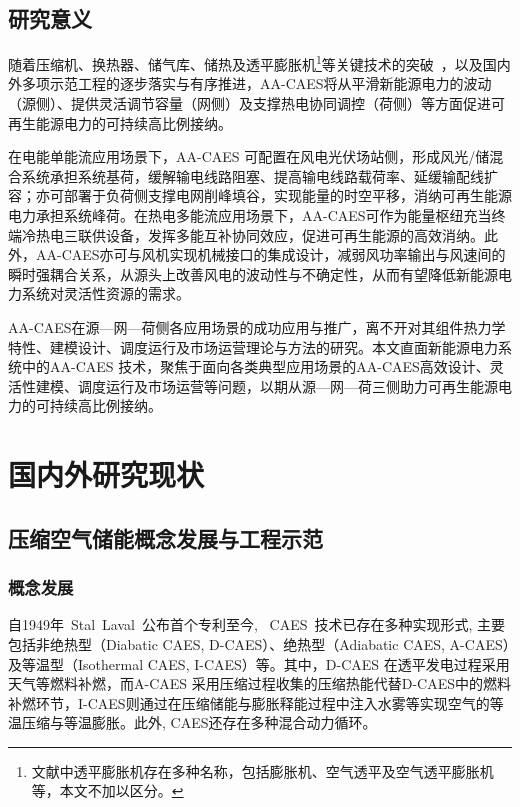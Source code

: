 \subsection{研究意义}
随着压缩机、换热器、储气库、储热及透平膨胀机\footnote{文献中透平膨胀机存在多种名称，包括膨胀机、空气透平及空气透平膨胀机等，本文不加以区分。}等关键技术的突破~\cite{CAES-Review-17-Rui-salt,TES-CSP-review-13}，以及国内外多项示范工程的逐步落实与有序推进，AA-CAES将从平滑新能源电力的波动（源侧）、提供灵活调节容量（网侧）及支撑热电协同调控（荷侧）等方面促进可再生能源电力的可持续高比例接纳。

在电能单能流应用场景下，AA-CAES 可配置在风电光伏场站侧，形成风光/储混合系统承担系统基荷，缓解输电线路阻塞、提高输电线路载荷率、延缓输配线扩容；亦可部署于负荷侧支撑电网削峰填谷，实现能量的时空平移，消纳可再生能源电力承担系统峰荷。在热电多能流应用场景下，AA-CAES可作为能量枢纽充当终端冷热电三联供设备，发挥多能互补协同效应，促进可再生能源的高效消纳。此外，AA-CAES亦可与风机实现机械接口的集成设计，减弱风功率输出与风速间的瞬时强耦合关系，从源头上改善风电的波动性与不确定性，从而有望降低新能源电力系统对灵活性资源的需求。

AA-CAES在源—网—荷侧各应用场景的成功应用与推广，离不开对其组件热力学特性、建模设计、调度运行及市场运营理论与方法的研究。本文直面新能源电力系统中的AA-CAES 技术，聚焦于面向各类典型应用场景的AA-CAES高效设计、灵活性建模、调度运行及市场运营等问题，以期从源—网—荷三侧助力可再生能源电力的可持续高比例接纳。

\section{国内外研究现状}
\label{sec:research-state}
\subsection{压缩空气储能概念发展与工程示范}
\label{sec:research-state-engineer}

\subsubsection{概念发展}
自1949年~Stal~Laval~公布首个专利至今, ~CAES~技术已存在多种实现形式, 主要包括非绝热型（Diabatic CAES, D-CAES）、绝热型（Adiabatic CAES, A-CAES）及等温型（Isothermal CAES, I-CAES）等。其中，D-CAES 在透平发电过程采用天气等燃料补燃，而A-CAES 采用压缩过程收集的压缩热能代替D-CAES中的燃料补燃环节，I-CAES则通过在压缩储能与膨胀释能过程中注入水雾等实现空气的等温压缩与等温膨胀。此外, CAES还存在多种混合动力循环\cite{Thesis-Zhangjunliang,Thesis-Liuxiao}。

